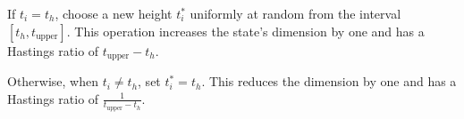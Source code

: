 \documentclass{article}
\begin{document}
                If $t_i = t_h$, choose a new height $t_i^*$ uniformly at random
                from the interval $\left[t_h, t_\text{upper}\right]$. This
                operation increases the state's dimension by one and has a
                Hastings ratio of $t_\text{upper} - t_h$.

                Otherwise, when $t_i \neq t_h$, set $t_i^* = t_h$. This reduces
                the dimension by one and has a Hastings ratio of
                $\frac{1}{t_\text{upper} - t_h}$.
\end{document}
